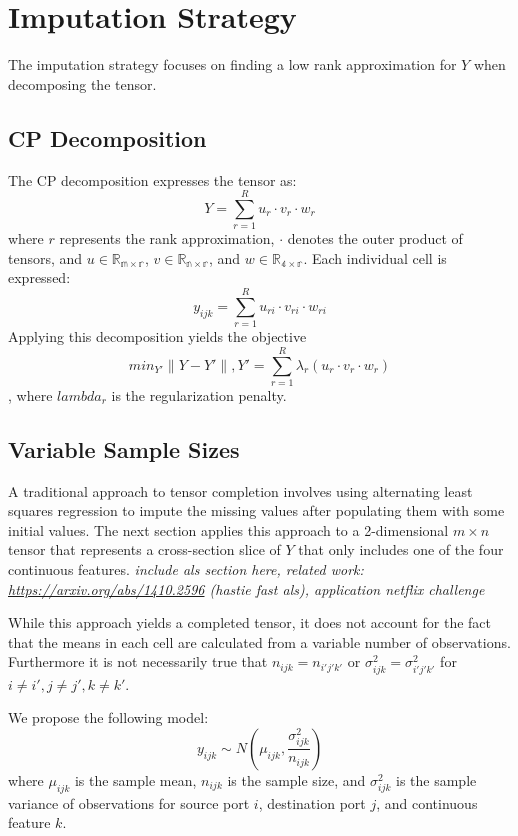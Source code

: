 \documentclass[12pt,twoside]{dukestatscithesis}
\theoremstyle{definition}
\theoremstyle{definition}
\theoremstyle{definition}
\theoremstyle{remark}
\begin{document}
\section{Imputation Strategy}\label{imputation-strategy}

The imputation strategy focuses on finding a low rank approximation for
\(Y\) when decomposing the tensor.

\subsection{CP Decomposition}\label{cp-decomposition}

The CP decomposition expresses the tensor as:
\[Y = \sum_{r=1}^Ru_r \cdotp v_r \cdotp w_r\] where \(r\) represents the
rank approximation, \(\cdotp\) denotes the outer product of tensors, and
\(u \in \mathbb{R_{m \times r}}\), \(v \in \mathbb{R_{n \times r}}\),
and \(w \in \mathbb{R_{4 \times r}}\). Each individual cell is
expressed: \[y_{ijk} = \sum_{r=1}^Ru_{ri} \cdotp v_{ri} \cdotp w_{ri}\]
Applying this decomposition yields the objective
\[min_{Y'}\|Y-Y'\|, Y' = \sum_{r=1}^R\lambda_r(u_r \cdotp v_r \cdotp w_r)\],
where \(lambda_r\) is the regularization penalty.

\subsection{Variable Sample Sizes}\label{variable-sample-sizes}

A traditional approach to tensor completion involves using alternating
least squares regression to impute the missing values after populating
them with some initial values. The next section applies this approach to
a 2-dimensional \(m \times n\) tensor that represents a cross-section
slice of \(Y\) that only includes one of the four continuous features.
\emph{include als section here, related work:
\url{https://arxiv.org/abs/1410.2596} (hastie fast als), application
netflix challenge}

While this approach yields a completed tensor, it does not account for
the fact that the means in each cell are calculated from a variable
number of observations. Furthermore it is not necessarily true that
\(n_{ijk} = n_{i'j'k'}\) or \(\sigma^2_{ijk} = \sigma^2_{i'j'k'}\) for
\(i \neq i', j \neq j', k \neq k'\).

We propose the following model:
\[y_{ijk} \sim N(\mu_{ijk}, \frac{\sigma^2_{ijk}}{n_{ijk}})\] where
\(\mu_{ijk}\) is the sample mean, \(n_{ijk}\) is the sample size, and
\(\sigma^2_{ijk}\) is the sample variance of observations for source
port \(i\), destination port \(j\), and continuous feature \(k\).
\end{document}
